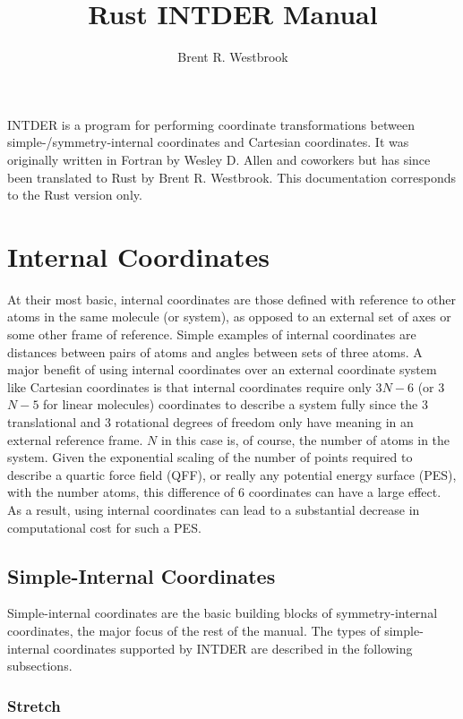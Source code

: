 \documentclass{article}
\title{Rust INTDER Manual}
\date{}
\author{Brent R. Westbrook}
\begin{document}
\maketitle

INTDER is a program for performing coordinate transformations between
simple-/symmetry-internal coordinates and Cartesian coordinates. It was
originally written in Fortran by Wesley D. Allen and coworkers but has since
been translated to Rust by Brent R. Westbrook. This documentation corresponds to
the Rust version only.

\section{Internal Coordinates}
\label{sec:coords}

At their most basic, internal coordinates are those defined with reference to
other atoms in the same molecule (or system), as opposed to an external set of
axes or some other frame of reference. Simple examples of internal coordinates
are distances between pairs of atoms and angles between sets of three atoms. A
major benefit of using internal coordinates over an external coordinate system
like Cartesian coordinates is that internal coordinates require only 3$N-6$ (or
3$N-5$ for linear molecules) coordinates to describe a system fully since the 3
translational and 3 rotational degrees of freedom only have meaning in an
external reference frame. $N$ in this case is, of course, the number of atoms in
the system. Given the exponential scaling of the number of points required to
describe a quartic force field (QFF), or really any potential energy surface
(PES), with the number atoms, this difference of 6 coordinates can have a large
effect. As a result, using internal coordinates can lead to a substantial
decrease in computational cost for such a PES.

\subsection{Simple-Internal Coordinates}
\label{sec:simple}

Simple-internal coordinates are the basic building blocks of symmetry-internal
coordinates, the major focus of the rest of the manual. The types of
simple-internal coordinates supported by INTDER are described in the following
subsections.

\subsubsection{Stretch}
\label{sec:stretch}
\end{document}
